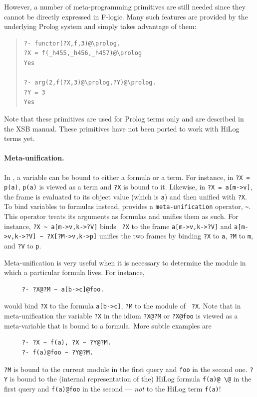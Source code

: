 \documentclass[11pt]{article}
\newcommand{\ERGO}{\mbox{\smaller{\ensuremath{\cal{E}}\smaller{{\sc{RGO}}}}}\xspace}
\newcommand{\FLSYSTEM}{\ERGO}
\newcommand{\bs}{\textbackslash}
\newcommand{\fl}{\mbox{F-logic}\xspace}
\begin{document}
However, a number of meta-programming primitives are still needed
since they cannot be directly expressed in \fl. Many such features are
provided by the underlying Prolog system and \FLSYSTEM simply takes advantage of
them: 
\begin{quote}
\begin{verbatim}
?- functor(?X,f,3)@\prolog.
?X = f(_h455,_h456,_h457)@\prolog
Yes

?- arg(2,f(?X,3)@\prolog,?Y)@\prolog.
?Y = 3
Yes
\end{verbatim}
\end{quote}
Note that these primitives are used for Prolog terms only and
are described in the XSB manual. These primitives have not been ported to
work with HiLog terms yet.

\paragraph{Meta-unification.}
In \FLSYSTEM, a variable can be bound to either a formula or a term. For instance,
in {\tt ?X = p(a)}, {\tt p(a)} is viewed as a term and {\tt ?X} is bound to
it. Likewise, in {\tt ?X = a[m->v]}, the frame is evaluated to its
object value (which is {\tt a}) and then unified with {\tt ?X}. To bind
variables to formulas instead, \FLSYSTEM provides a {\tt meta-unification}
operator, \verb|~|.  This operator treats its arguments as formulas and
unifies them as such. For instance, {\tt ?X \verb|~| a[m->v,k->?V]} binds {\tt
  ?X} to the frame {\tt a[m->v,k->?V]} and {\tt a[m->v,k->?V] \verb|~|
  ?X[?M->v,k->p]} unifies the two frames by binding {\tt ?X} to {\tt a},
{\tt ?M} to {\tt m}, and {\tt ?V} to {\tt p}.

Meta-unification is very useful when it is necessary to determine the module
in which a particular formula lives. For instance,
\begin{verbatim}
     ?- ?X@?M ~ a[b->c]@foo.  
\end{verbatim}
would bind {\tt ?X} to the formula {\tt a[b->c]},  {\tt ?M} to the module of {\tt
?X}. Note that in meta-unification the variable {\tt ?X} in the idiom
\verb|?X@?M| or \verb|?X@foo| is viewed as a meta-variable that is bound to
a formula.  More subtle examples are
\begin{verbatim}
     ?- ?X ~ f(a), ?X ~ ?Y@?M.  
     ?- f(a)@foo ~ ?Y@?M.
\end{verbatim}
{\tt ?M} is bound to the current module in the first query and {\tt foo} in the
second one. {\tt ?Y} is bound to the (internal representation of the)
HiLog formula {\tt f(a)@ \bs{}@} in the first query and {\tt f(a)@foo} in
the second --- \emph{not} to the HiLog term {\tt f(a)}!
\end{document}
